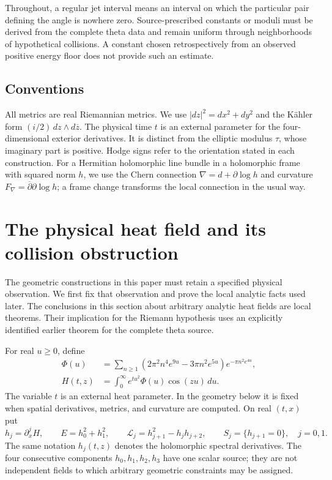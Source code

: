 \documentclass[11pt]{article}
\numberwithin{equation}{section}
\theoremstyle{definition}
\theoremstyle{remark}
\begin{document}
Throughout, a regular jet interval means an interval on which the
particular pair defining the angle is nowhere zero.  Source-prescribed
constants or moduli must be derived from the complete theta data and
remain uniform through neighborhoods of hypothetical collisions.  A
constant chosen retrospectively from an observed positive energy floor
does not provide such an estimate.

\subsection{Conventions}
All metrics are real Riemannian metrics.  We use
$|dz|^2=dx^2+dy^2$ and the K\"ahler form
$(i/2)\,dz\wedge d\overline z$.  The physical time $t$ is an external
parameter for the four-dimensional exterior derivatives.  It is
distinct from the elliptic modulus $\tau$, whose imaginary part is
positive.  Hodge signs refer to the orientation stated in each
construction.  For a Hermitian holomorphic line bundle in a holomorphic
frame with squared norm $h$, we use the Chern connection
$\nabla= d+\partial\log h$ and curvature
$F_\nabla=\overline\partial\partial\log h$; a frame change transforms
the local connection in the usual way.

\section{The physical heat field and its collision obstruction}
\label{phy:physical-field}

The geometric constructions in this paper must retain a specified physical
observation.  We first fix that observation and prove the local analytic
facts used later.  The conclusions in this section about arbitrary analytic
heat fields are local theorems.  Their implication for the Riemann hypothesis
uses an explicitly identified earlier theorem for the complete theta source.

For real $u\ge0$, define
\begin{align}
 \Phi(u)&=\sum_{n\ge1}
  (2\pi^2n^4e^{9u}-3\pi n^2e^{5u})e^{-\pi n^2e^{4u}},
 \label{phy:source}\\
 H(t,z)&=\int_0^\infty e^{tu^2}\Phi(u)\cos(zu)\,du.
 \label{phy:heat-field}
\end{align}
The variable $t$ is an external heat parameter.  In the geometry below it
is fixed when spatial derivatives, metrics, and curvature are computed.
On real $(t,x)$ put
\begin{equation}
 h_j=\partial_x^jH,\qquad E=h_0^2+h_1^2,\qquad
 \mathcal L_j=h_{j+1}^2-h_jh_{j+2},\qquad
 S_j=\{h_{j+1}=0\},\quad j=0,1.
 \label{phy:observations}
\end{equation}
The same notation $h_j(t,z)$ denotes the holomorphic spectral derivatives.
The four consecutive components $h_0,h_1,h_2,h_3$ have one scalar source;
they are not independent fields to which arbitrary geometric constraints
may be assigned.
\end{document}
